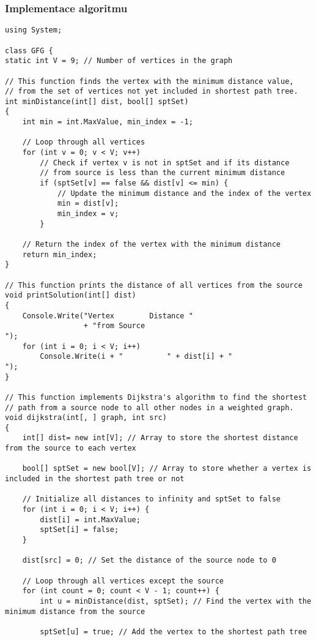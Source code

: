 \documentclass[12pt, titlepage, a4paper]{article}
\begin{document}
\subsubsection{Implementace algoritmu}
\begin{lstlisting}
using System;

class GFG {
static int V = 9; // Number of vertices in the graph

// This function finds the vertex with the minimum distance value,
// from the set of vertices not yet included in shortest path tree.
int minDistance(int[] dist, bool[] sptSet)
{
    int min = int.MaxValue, min_index = -1;

    // Loop through all vertices
    for (int v = 0; v < V; v++)
        // Check if vertex v is not in sptSet and if its distance
        // from source is less than the current minimum distance
        if (sptSet[v] == false && dist[v] <= min) {
            // Update the minimum distance and the index of the vertex
            min = dist[v];
            min_index = v;
        }

    // Return the index of the vertex with the minimum distance
    return min_index;
}

// This function prints the distance of all vertices from the source
void printSolution(int[] dist)
{
    Console.Write("Vertex 		 Distance "
                  + "from Source
");
    for (int i = 0; i < V; i++)
        Console.Write(i + " 		 " + dist[i] + "
");
}

// This function implements Dijkstra's algorithm to find the shortest
// path from a source node to all other nodes in a weighted graph.
void dijkstra(int[, ] graph, int src)
{
    int[] dist= new int[V]; // Array to store the shortest distance from the source to each vertex

    bool[] sptSet = new bool[V]; // Array to store whether a vertex is included in the shortest path tree or not

    // Initialize all distances to infinity and sptSet to false
    for (int i = 0; i < V; i++) {
        dist[i] = int.MaxValue;
        sptSet[i] = false;
    }

    dist[src] = 0; // Set the distance of the source node to 0

    // Loop through all vertices except the source
    for (int count = 0; count < V - 1; count++) {
        int u = minDistance(dist, sptSet); // Find the vertex with the minimum distance from the source

        sptSet[u] = true; // Add the vertex to the shortest path tree


\end{lstlisting}
\end{document}

